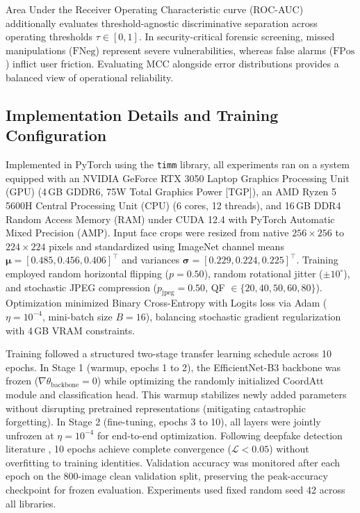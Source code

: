 \documentclass[conference]{IEEEtran}
\begin{document}
Area Under the Receiver Operating Characteristic curve (ROC-AUC) additionally evaluates threshold-agnostic discriminative separation across operating thresholds $\tau \in [0, 1]$. In security-critical forensic screening, missed manipulations ($\text{FNeg}$) represent severe vulnerabilities, whereas false alarms ($\text{FPos}$) inflict user friction. Evaluating $\text{MCC}$ alongside error distributions provides a balanced view of operational reliability.

\subsection{Implementation Details and Training Configuration}
Implemented in PyTorch using the \texttt{timm} library, all experiments ran on a system equipped with an NVIDIA GeForce RTX 3050 Laptop Graphics Processing Unit (GPU) (4\,GB GDDR6, 75W Total Graphics Power [TGP]), an AMD Ryzen 5 5600H Central Processing Unit (CPU) (6 cores, 12 threads), and 16\,GB DDR4 Random Access Memory (RAM) under CUDA 12.4 with PyTorch Automatic Mixed Precision (AMP). Input face crops were resized from native $256 \times 256$ to $224 \times 224$ pixels and standardized using ImageNet channel means $\boldsymbol{\mu} = [0.485, 0.456, 0.406]^\top$ and variances $\boldsymbol{\sigma} = [0.229, 0.224, 0.225]^\top$. Training employed random horizontal flipping ($p = 0.50$), random rotational jitter ($\pm 10^\circ$), and stochastic JPEG compression ($p_{\text{jpeg}} = 0.50$, QF $\in \{20, 40, 50, 60, 80\}$). Optimization minimized Binary Cross-Entropy with Logits loss via Adam ($\eta = 10^{-4}$, mini-batch size $B = 16$), balancing stochastic gradient regularization with 4\,GB VRAM constraints.

Training followed a structured two-stage transfer learning schedule across 10 epochs. In Stage 1 (warmup, epochs 1 to 2), the EfficientNet-B3 backbone was frozen ($\nabla \theta_{\text{backbone}} = 0$) while optimizing the randomly initialized CoordAtt module and classification head. This warmup stabilizes newly added parameters without disrupting pretrained representations (mitigating catastrophic forgetting). In Stage 2 (fine-tuning, epochs 3 to 10), all layers were jointly unfrozen at $\eta = 10^{-4}$ for end-to-end optimization. Following deepfake detection literature \cite{deepa2026enhanced}, 10 epochs achieve complete convergence ($\mathcal{L} < 0.05$) without overfitting to training identities. Validation accuracy was monitored after each epoch on the 800-image clean validation split, preserving the peak-accuracy checkpoint for frozen evaluation. Experiments used fixed random seed 42 across all libraries.
\end{document}
